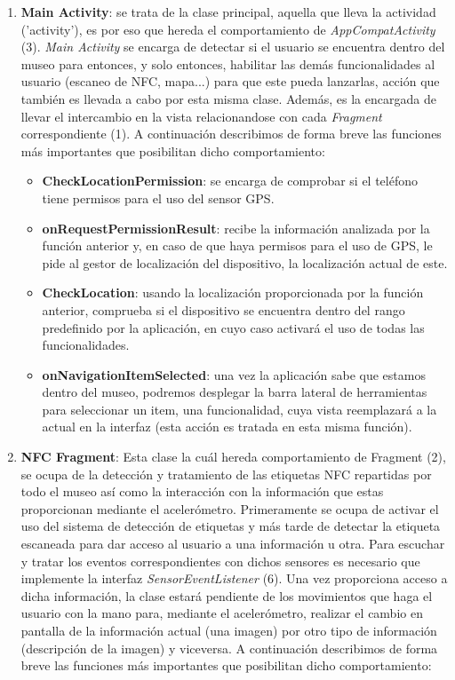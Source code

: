 \begin{enumerate}
	\item \textbf{Main Activity}: se trata de la clase principal, aquella que lleva la actividad ('activity'), es por eso que hereda el comportamiento de \textit{AppCompatActivity} (3). \textit{Main Activity} se encarga de detectar si el usuario se encuentra dentro del museo para entonces, y solo entonces, habilitar las demás funcionalidades al usuario (escaneo de NFC, mapa...) para que este pueda lanzarlas, acción que también es llevada a cabo por esta misma clase. Además, es la encargada de llevar el intercambio en la vista relacionandose con cada \textit{Fragment} correspondiente (1). A continuación describimos de forma breve las funciones más importantes que posibilitan dicho comportamiento:
		\begin{itemize}
			\item \textbf{CheckLocationPermission}: se encarga de comprobar si el teléfono tiene permisos para el uso del sensor GPS.
			\item \textbf{onRequestPermissionResult}: recibe la información analizada por la función anterior y, en caso de que haya permisos para el uso de GPS, le pide al gestor de localización del dispositivo, la localización actual de este.
			\item \textbf{CheckLocation}: usando la localización proporcionada por la función anterior, comprueba si el dispositivo se encuentra dentro del rango predefinido por la aplicación, en cuyo caso activará el uso de todas las funcionalidades.
			\item \textbf{onNavigationItemSelected}: una vez la aplicación sabe que estamos dentro del museo, podremos desplegar la barra lateral de herramientas para seleccionar un item, una funcionalidad, cuya vista reemplazará a la actual en la interfaz (esta acción es tratada en esta misma función).
		\end{itemize}
	\item \textbf{NFC Fragment}: Esta clase la cuál hereda comportamiento de Fragment (2), se ocupa de la detección y tratamiento de las etiquetas NFC repartidas por todo el museo así como la interacción con la información que estas proporcionan mediante el acelerómetro. Primeramente se ocupa de activar el uso del sistema de detección de etiquetas y más tarde de detectar la etiqueta escaneada para dar acceso al usuario a una información u otra. Para escuchar y tratar los eventos correspondientes con dichos sensores es necesario que implemente la interfaz \textit{SensorEventListener} (6). Una vez proporciona acceso a dicha información, la clase estará pendiente de los movimientos que haga el usuario con la mano para, mediante el acelerómetro, realizar el cambio en pantalla de la información actual (una imagen) por otro tipo de información (descripción de la imagen) y viceversa. A continuación describimos de forma breve las funciones más importantes que posibilitan dicho comportamiento:

\end{enumerate}
